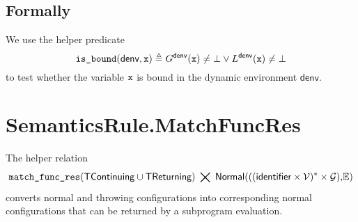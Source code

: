 \documentclass{book}
\newcommand\eqname[0]{\stackrel{\mathsmaller{\mathsf{is}}}{=}}
\newcommand\eqdef[0]{:=}
\newcommand\XGraphs[0]{\mathcal{G}}
\newcommand\tenv[0]{\textsf{tenv}}
\newcommand\denv[0]{\textsf{denv}}
\newcommand\vals[0]{\mathcal{V}}
\newcommand\ordered[3]{{#1}\xrightarrow{#2}{#3}}
\newcommand\evalarrow[0]{\stackrel{\mathsf{asl}}{\rightsquigarrow}}
\newcommand\aslrel[0]{\bigtimes}
\newcommand\aslsep[0]{\mathbf{,}}
\newcommand\TContinuing[0]{\textsf{TContinuing}}
\newcommand\TReturning[0]{\textsf{TReturning}}
\newcommand\assignnamedargs[0]{\texttt{assign\_named\_args}}
\newcommand\matchfuncres[0]{\texttt{match\_func\_res}}
\newcommand\Normal[0]{\textsf{Normal}}
\newcommand\newenv[0]{\texttt{new\_env}}
\newcommand\env[0]{\texttt{env}}
\newcommand\envone[0]{\texttt{env1}}
\newcommand\newg[0]{\texttt{new\_g}}
\newcommand\vm[0]{\texttt{m}}
\newcommand\vgone[0]{\texttt{g1}}
\newcommand\vgtwo[0]{\texttt{g2}}
\newcommand\vgthree[0]{\texttt{g3}}
\newcommand\params[0]{\texttt{params}}
\newcommand\paramsone[0]{\texttt{params1}}
\newcommand\vacc[0]{\texttt{acc}}
\begin{document}
\begin{emptyformal}
\subsection{Formally}
\newcommand\isbound[0]{\texttt{is\_bound}}
We use the helper predicate
\[
\isbound(\denv, \vx) \triangleq G^\denv(\vx) \neq \bot \vee L^\denv(\vx) \neq \bot
\]
to test whether the variable $\texttt{x}$ is bound in the dynamic environment $\denv$.

\end{emptyformal}


\section{SemanticsRule.MatchFuncRes \label{sec:SemanticsRule.MatchFuncRes}}
The helper relation
\[
    \matchfuncres(\TContinuing \cup \TReturning) \;\aslrel\;
                  \Normal(((\identifier\times\vals)^*\times\XGraphs)\aslsep\envs)
\]
converts normal and throwing configurations
into corresponding normal configurations that can be returned by a subprogram evaluation.
\end{document}
